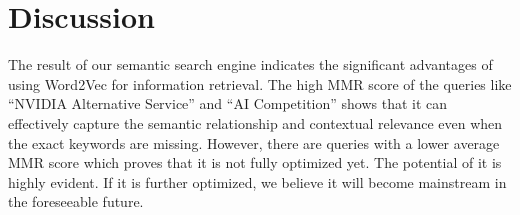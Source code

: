 \section{Discussion}

The result of our semantic search engine indicates the significant advantages of using Word2Vec for information retrieval. The high MMR score of the queries like “NVIDIA Alternative Service” and “AI Competition” shows that it can effectively capture the semantic relationship and contextual relevance even when the exact keywords are missing. However, there are queries with a lower average MMR score which proves that it is not fully optimized yet. The potential of it is highly evident. If it is further optimized, we believe it will become mainstream in the foreseeable future. 